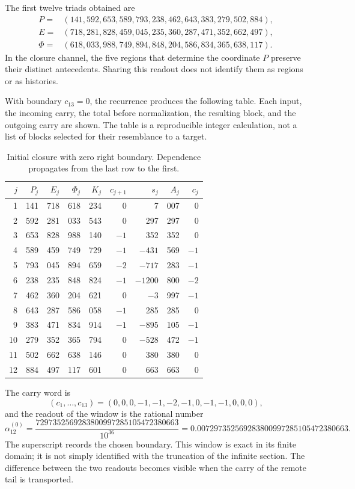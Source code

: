The first twelve triads obtained are
\begin{align*}
 P={}&(141,592,653,589,793,238,462,643,383,279,502,884),\\
 E={}&(718,281,828,459,045,235,360,287,471,352,662,497),\\
 \Phi={}&(618,033,988,749,894,848,204,586,834,365,638,117).
\end{align*}
In the closure channel, the five regions that determine the coordinate \(P\)
preserve their distinct antecedents. Sharing this readout does not identify
them as regions or as histories.

With boundary \(c_{13}=0\), the recurrence produces the following table.
Each input, the incoming carry, the total before normalization, the resulting
block, and the outgoing carry are shown. The table is a reproducible integer
calculation, not a list of blocks selected for their resemblance to a target.

\begin{table}[htbp]
\centering
\small
\setlength{\tabcolsep}{3.5pt}
\begin{tabular}{r|rrrr|rr|rr}
\hline
\(j\)&\(P_j\)&\(E_j\)&\(\Phi_j\)&\(K_j\)&\(c_{j+1}\)&\(s_j\)&\(A_j\)&\(c_j\)\\
\hline
1&141&718&618&234&0&7&007&0\\
2&592&281&033&543&0&297&297&0\\
3&653&828&988&140&\(-1\)&352&352&0\\
4&589&459&749&729&\(-1\)&\(-431\)&569&\(-1\)\\
5&793&045&894&659&\(-2\)&\(-717\)&283&\(-1\)\\
6&238&235&848&824&\(-1\)&\(-1200\)&800&\(-2\)\\
7&462&360&204&621&0&\(-3\)&997&\(-1\)\\
8&643&287&586&058&\(-1\)&285&285&0\\
9&383&471&834&914&\(-1\)&\(-895\)&105&\(-1\)\\
10&279&352&365&794&0&\(-528\)&472&\(-1\)\\
11&502&662&638&146&0&380&380&0\\
12&884&497&117&601&0&663&663&0\\
\hline
\end{tabular}
\caption{Initial closure with zero right boundary. Dependence propagates from the last row to the first.}
\label{tab:alpha-ventana}
\end{table}

The carry word is
\[
 (c_1,\ldots,c_{13})=(0,0,0,-1,-1,-2,-1,0,-1,-1,0,0,0),
\]
and the readout of the window is the rational number
\begin{equation}
 \alpha_{12}^{(0)}
 =\frac{7297352569283800997285105472380663}{10^{36}}
 =0.007297352569283800997285105472380663.
 \label{eq:alpha-ventana-cero}
\end{equation}
The superscript records the chosen boundary. This window is exact in its
finite domain; it is not simply identified with the truncation of the infinite
section. The difference between the two readouts becomes visible when the
carry of the remote tail is transported.

